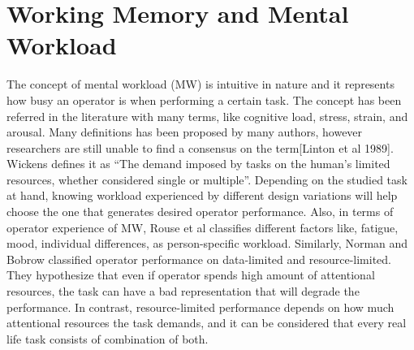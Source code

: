 \documentclass[a4paper]{report}
\begin{document}
	\section{Working Memory and Mental Workload}
		The concept of mental workload (MW) is intuitive in nature and it represents how busy an operator is when performing a certain task. The concept has been referred in the literature with many terms, like cognitive load, stress, strain, and arousal. Many definitions has been proposed by many authors, however researchers are still unable to find a consensus on the term[Linton et al 1989]. Wickens\cite{wickens2008multiple} defines it as ``The demand imposed by tasks on the human's limited resources, whether considered single or multiple''. Depending on the studied task at hand, knowing workload experienced by different design variations will help choose the one that generates desired operator performance. Also, in terms of operator experience of MW, Rouse et al classifies different factors like, fatigue, mood, individual differences, as person-specific workload\cite{rouse1993modeling}. Similarly, Norman and Bobrow classified operator performance on data-limited and resource-limited\cite{norman1975data}. They hypothesize that even if operator spends high amount of attentional resources, the task can have a bad representation that will degrade the performance. In contrast, resource-limited performance depends on how much attentional resources the task demands, and it can be considered that every real life task consists of combination of both. 
\end{document}
